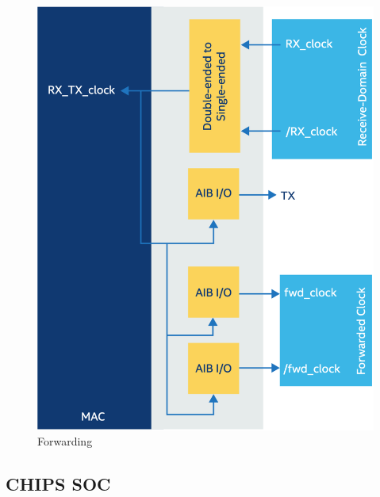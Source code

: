 \documentclass[../main.tex]{subfiles}
\begin{document}
\begin{figure}
    \centering
    \includegraphics[scale=.2]{pngs/AIB-Rx-Tx.png}
    \caption{Forwarding\cite{AIBWhitePaper}}
    \label{fig:AIB-Rx-Tx}
\end{figure}

\subsection{CHIPS SOC}
\end{document}

